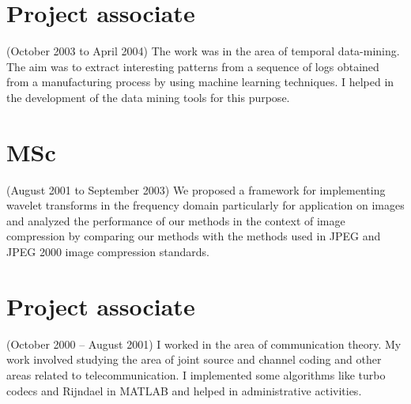\documentclass[margin,10pt]{res} %
\begin{document}
\begin{resume}
{\section{\textnormal{Project associate}}\label{sec:dataMining}
(October 2003 to April 2004)
The work was in the area of temporal data-mining. 
The aim was to extract interesting patterns from a sequence of logs
obtained from a manufacturing process by using machine learning techniques.
I helped in the development of the data mining tools for this purpose.
%
\section{\textnormal{MSc}}\label{sec:mastersAbstract}
(August 2001 to September 2003)
We proposed a framework for implementing wavelet transforms in the
frequency domain particularly for application on images and analyzed the
performance of our methods in the context of image compression by comparing
our methods with the methods used in JPEG and JPEG 2000 image compression
standards.
\section{\textnormal{Project associate}}\label{sec:turbo}
(October 2000 -- August 2001)
I worked in the area of communication theory. My work involved studying
the area of joint source and channel coding and other areas related to
telecommunication. I implemented some algorithms like turbo codecs and
Rijndael in MATLAB and helped in administrative activities.

}
\end{resume}
\end{document}
